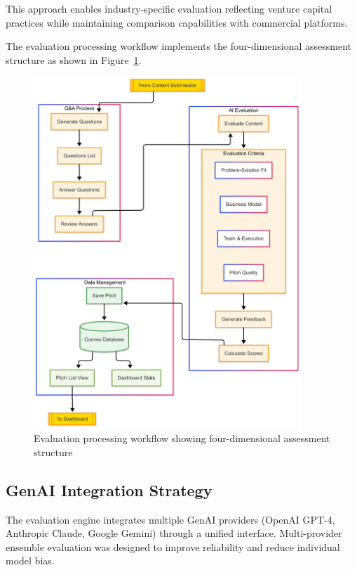 This approach enables industry-specific evaluation reflecting venture capital practices while maintaining comparison capabilities with commercial platforms.

The evaluation processing workflow implements the four-dimensional assessment structure as shown in Figure~\ref{fig:eval-flow}.

\begin{figure}[H]
  \centering
  \includegraphics[width=0.9\textwidth]{img/eval-flow.png}
  \caption{Evaluation processing workflow showing four-dimensional assessment structure}
  \label{fig:eval-flow}
\end{figure}

\subsection{GenAI Integration Strategy}\label{subsec:ai-integration-strategy}
The evaluation engine integrates multiple GenAI providers (OpenAI GPT-4, Anthropic Claude, Google Gemini) through a unified interface. Multi-provider ensemble evaluation was designed to improve reliability and reduce individual model bias.

